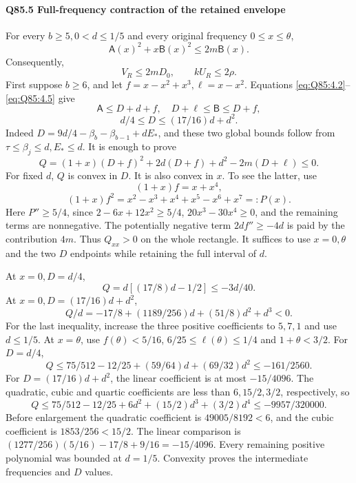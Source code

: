 \paragraph{Q85.5 Full-frequency contraction of the retained envelope}\label{calc:Q85:retained-contraction}
For every \(b\ge\allowbreak 5,\allowbreak 0<\allowbreak d\le\allowbreak 1/5\) and every original frequency
\(0\le\allowbreak  x\le\allowbreak \theta\),
\[
 \boxed{\mathsf A(x)^2+x\mathsf B(x)^2\le2m\mathsf B(x).} \tag{Q85.5.1}\label{eq:Q85:5.1}
\]
Consequently,
\[
 V_R\le2mD_0,\qquad kU_R\le2\rho.                  \tag{Q85.5.2}\label{eq:Q85:5.2}
\]
First suppose \(b\ge\allowbreak 6\), and let \(f=\allowbreak x-x^2+x^3,\allowbreak \ell=\allowbreak x-x^2\).
Equations \eqref{eq:Q85:4.2}--\eqref{eq:Q85:4.5} give
\[
 \mathsf A\le D+d+f,\quad D+\ell\le\mathsf B\le D+f,
\]
\[
 d/4\le D\le(17/16)d+d^2.                           \tag{Q85.5.3}\label{eq:Q85:5.3}
\]
Indeed
\(D=\allowbreak 9d/4-\beta_b-\beta_{b-1}+dE_*\), and these two global bounds follow from
\(\tau\le\allowbreak \beta_j\le\allowbreak  d,\allowbreak E_*\le\allowbreak  d\). It is enough to prove
\[
 Q=(1+x)(D+f)^2+2d(D+f)+d^2-2m(D+\ell)\le0.         \tag{Q85.5.4}\label{eq:Q85:5.4}
\]
For fixed \(d\), \(Q\) is convex in \(D\). It is also convex in \(x\).
To see the latter, use
\[
 (1+x)f=x+x^4,
\]
\[
 (1+x)f^2=x^2-x^3+x^4+x^5-x^6+x^7=:P(x).
\]
Here \(P''\ge\allowbreak 5/4\), since
\(2-6x+12x^2\ge\allowbreak 5/4\), \(20x^3-30x^4\ge\allowbreak 0\), and the remaining terms are nonnegative.
The potentially negative term \(2df''\ge\allowbreak -4d\) is paid by the contribution \(4m\).
Thus \(Q_{xx}>\allowbreak 0\) on the whole rectangle.
It suffices to use \(x=\allowbreak 0,\allowbreak \theta\) and the two \(D\) endpoints while retaining the full interval of \(d\).

At \(x=\allowbreak 0,\allowbreak D=\allowbreak d/4\),
\[
 Q=d[(17/8)d-1/2]\le-3d/40.
\]
At \(x=\allowbreak 0,\allowbreak D=\allowbreak (17/16)d+d^2\),
\[
 Q/d=-17/8+(1189/256)d+(51/8)d^2+d^3<0.
\]
For the last inequality, increase the three positive coefficients to \(5,\allowbreak 7,\allowbreak 1\) and use \(d\le\allowbreak 1/5\).
At \(x=\allowbreak \theta\), use
\(f(\theta)<\allowbreak 5/16\), \(6/25\le\allowbreak \ell(\theta)\le\allowbreak 1/4\) and \(1+\theta<\allowbreak 3/2\).
For \(D=\allowbreak d/4\),
\[
 Q\le75/512-12/25+(59/64)d+(69/32)d^2
 \le-161/2560.                                      \tag{Q85.5.5}\label{eq:Q85:5.5}
\]
For \(D=\allowbreak (17/16)d+d^2\), the linear coefficient is at most \(-15/4096\).
The quadratic, cubic and quartic coefficients are less than \(6,\allowbreak 15/2,\allowbreak 3/2\), respectively, so
\[
 Q\le75/512-12/25+6d^2+(15/2)d^3+(3/2)d^4
 \le-9957/320000.                                    \tag{Q85.5.6}\label{eq:Q85:5.6}
\]
Before enlargement the quadratic coefficient is \(49005/8192<\allowbreak 6\), and the cubic coefficient is \(1853/256<\allowbreak 15/2\).
The linear comparison is
\((1277/256)(5/16)-17/8+9/16=\allowbreak -15/4096\).
Every remaining positive polynomial was bounded at \(d=\allowbreak 1/5\).
Convexity proves the intermediate frequencies and \(D\) values.

